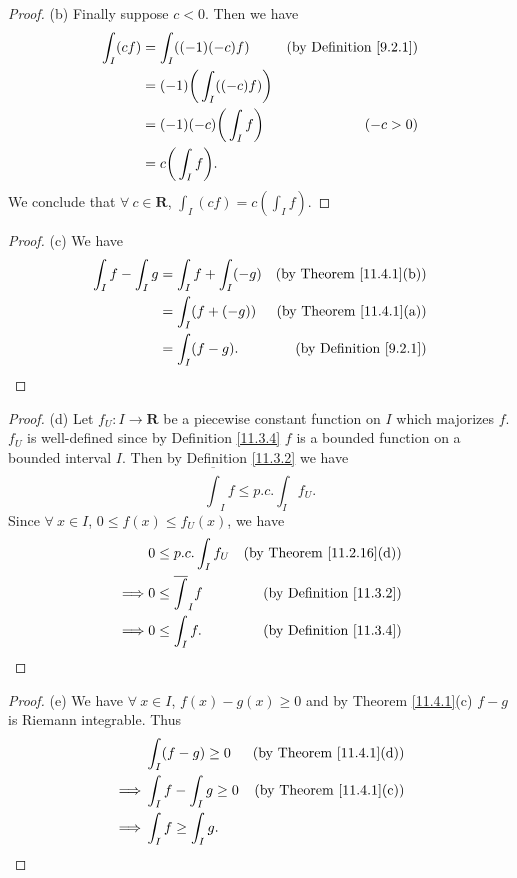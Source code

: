 \begin{proof}{(b)}
    Finally suppose \(c < 0\).
    Then we have
    \begin{align*}
        \int_I (cf) & = \int_I ((-1)(-c)f)              & \text{(by Definition \ref{9.2.1})} \\
                    & = (-1) \bigg(\int_I ((-c)f)\bigg)                                      \\
                    & = (-1)(-c) \bigg(\int_I f\bigg)   & (-c > 0)                           \\
                    & = c \bigg(\int_I f\bigg).
    \end{align*}
    We conclude that \(\forall\ c \in \mathbf{R}\), \(\int_I (cf) = c (\int_I f)\).
\end{proof}

\begin{proof}{(c)}
    We have
    \begin{align*}
        \int_I f - \int_I g & = \int_I f + \int_I (-g) & \text{(by Theorem \ref{11.4.1}(b))} \\
                            & = \int_I (f + (-g))      & \text{(by Theorem \ref{11.4.1}(a))} \\
                            & = \int_I (f - g).        & \text{(by Definition \ref{9.2.1})}
    \end{align*}
\end{proof}

\begin{proof}{(d)}
    Let \(f_U : I \to \mathbf{R}\) be a piecewise constant function on \(I\) which majorizes \(f\).
    \(f_U\) is well-defined since by Definition \ref{11.3.4} \(f\) is a bounded function on a bounded interval \(I\).
    Then by Definition \ref{11.3.2} we have
    \[
        \overline{\int}_I f \leq p.c. \int_I f_U.
    \]
    Since \(\forall\ x \in I\), \(0 \leq f(x) \leq f_U(x)\), we have
    \begin{align*}
                 & 0 \leq p.c. \int_I f_U     & \text{(by Theorem \ref{11.2.16}(d))} \\
        \implies & 0 \leq \overline{\int}_I f & \text{(by Definition \ref{11.3.2})}  \\
        \implies & 0 \leq \int_I f.           & \text{(by Definition \ref{11.3.4})}
    \end{align*}
\end{proof}

\begin{proof}{(e)}
    We have \(\forall\ x \in I\), \(f(x) - g(x) \geq 0\) and by Theorem \ref{11.4.1}(c) \(f - g\) is Riemann integrable.
    Thus
    \begin{align*}
                 & \int_I (f - g) \geq 0      & \text{(by Theorem \ref{11.4.1}(d))} \\
        \implies & \int_I f - \int_I g \geq 0 & \text{(by Theorem \ref{11.4.1}(c))} \\
        \implies & \int_I f \geq \int_I g.
    \end{align*}
\end{proof}

